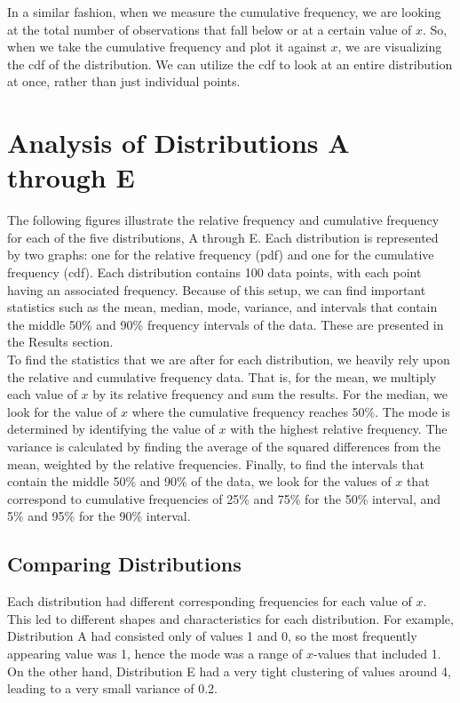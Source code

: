 \documentclass[12pt]{article}
\begin{document}
In a similar fashion, when we measure the cumulative frequency, we are looking at the total number of observations that fall below or at a certain value of \(x\). So, when we take the cumulative frequency and plot it against \(x\), we are visualizing the cdf of the distribution. We can utilize the cdf to look at an entire distribution at once, rather than just individual points.

\section{Analysis of Distributions A through E}

The following figures illustrate the relative frequency and cumulative frequency for each of the five distributions, A through E. Each distribution is represented by two graphs: one for the relative frequency (pdf) and one for the cumulative frequency (cdf). Each distribution contains 100 data points, with each point having an associated frequency. Because of this setup, we can find important statistics such as the mean, median, mode, variance, and intervals that contain the middle 50\% and 90\% frequency intervals of the data. These are presented in the Results section. \\

To find the statistics that we are after for each distribution, we heavily rely upon the relative and cumulative frequency data. That is, for the mean, we multiply each value of \(x\) by its relative frequency and sum the results. For the median, we look for the value of \(x\) where the cumulative frequency reaches 50\%. The mode is determined by identifying the value of \(x\) with the highest relative frequency. The variance is calculated by finding the average of the squared differences from the mean, weighted by the relative frequencies. Finally, to find the intervals that contain the middle 50\% and 90\% of the data, we look for the values of \(x\) that correspond to cumulative frequencies of 25\% and 75\% for the 50\% interval, and 5\% and 95\% for the 90\% interval.  

\subsection{Comparing Distributions}

Each distribution had different corresponding frequencies for each value of \(x\). This led to different shapes and characteristics for each distribution. For example, Distribution A had consisted only of values 1 and 0, so the most frequently appearing value was 1, hence the mode was a range of \(x\)-values that included 1. On the other hand, Distribution E had a very tight clustering of values around 4, leading to a very small variance of 0.2.
\end{document}
